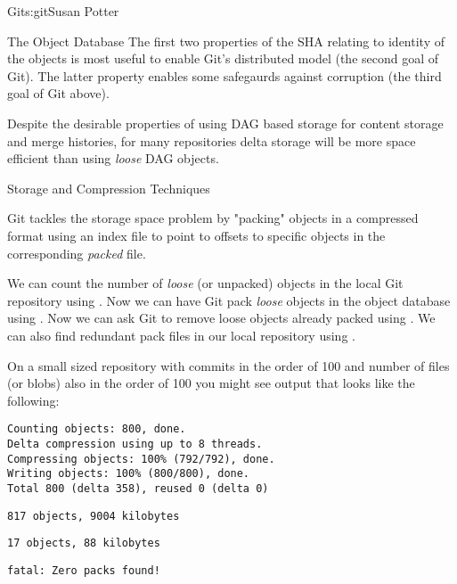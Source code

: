 \begin{aosachapter}{Git}{s:git}{Susan Potter}
\begin{aosasect1}{The Object Database}
The first two properties of the SHA relating to identity of the objects is
most useful to enable Git's distributed model (the second goal of Git).
The latter property enables some safegaurds against corruption (the third
goal of Git above).

Despite the desirable properties of using DAG based storage for content
storage and merge histories, for many repositories delta storage will be
more space efficient than using \emph{loose} DAG objects.

\end{aosasect1}

\begin{aosasect1}{Storage and Compression Techniques}

Git tackles the storage space problem by "packing" objects in a compressed
format using an index file to point to offsets to specific objects in the
corresponding \emph{packed} file.


We can count the number of \emph{loose} (or unpacked) objects in the local
Git repository using . Now we can have Git pack
\emph{loose} objects in the object database using . Now we
can ask Git to remove loose objects already packed using
. We can also find redundant pack files in our local
repository using .

On a small sized repository with commits in the order of 100 and number of
files (or blobs) also in the order of 100 you might see output that looks
like the following:

\begin{aosaitemize}
  \item {} \newline
\begin{verbatim}Counting objects: 800, done.
Delta compression using up to 8 threads.
Compressing objects: 100% (792/792), done.
Writing objects: 100% (800/800), done.
Total 800 (delta 358), reused 0 (delta 0)\end{verbatim}
  \item {} \newline
\begin{verbatim}817 objects, 9004 kilobytes\end{verbatim}
  \item {}
  \item {} \newline
\begin{verbatim}17 objects, 88 kilobytes\end{verbatim}
  \item {} \newline
\begin{verbatim}fatal: Zero packs found!\end{verbatim}
\end{aosaitemize}


\end{aosasect1}
\end{aosachapter}

